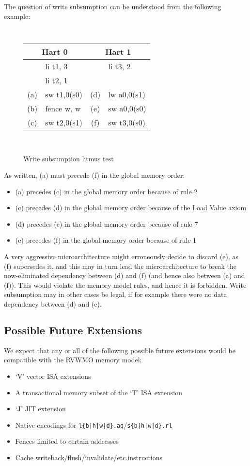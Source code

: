 The question of write subsumption can be understood from the following example:
\begin{figure}[h!]
  \centering
  {
    \tt\small
    \begin{tabular}{cl||cl}
    \multicolumn{2}{c}{Hart 0} & \multicolumn{2}{c}{Hart 1} \\
    \hline
        & li t1, 3    &     & li  t3, 2    \\
        & li t2, 1    &     &              \\
    (a) & sw t1,0(s0) & (d) & lw  a0,0(s1) \\
    (b) & fence w, w  & (e) & sw  a0,0(s0) \\
    (c) & sw t2,0(s1) & (f) & sw  t3,0(s0) \\
    \end{tabular}
  }
  ~~~~
  \diagram
  \caption{Write subsumption litmus test}
  \label{fig:litmus:subsumption}
\end{figure}

As written, (a) must precede (f) in the global memory order:
\begin{itemize}
  \item (a) precedes (c) in the global memory order because of rule 2
  \item (c) precedes (d) in the global memory order because of the Load Value axiom
  \item (d) precedes (e) in the global memory order because of rule 7
  \item (e) precedes (f) in the global memory order because of rule 1
\end{itemize}

A very aggressive microarchitecture might erroneously decide to discard (e), as (f) supersedes it, and this may in turn lead the microarchitecture to break the now-eliminated dependency between (d) and (f) (and hence also between (a) and (f)).
This would violate the memory model rules, and hence it is forbidden.
Write subsumption may in other cases be legal, if for example there were no data dependency between (d) and (e).

\subsection{Possible Future Extensions}

We expect that any or all of the following possible future extensions would be compatible with the RVWMO memory model:

\begin{itemize}
  \item `V' vector ISA extensions
  \item A transactional memory subset of the `T' ISA extension
  \item `J' JIT extension
  \item Native encodings for {\tt l\{b|h|w|d\}.aq}/{\tt s\{b|h|w|d\}.rl}
  \item Fences limited to certain addresses
  \item Cache writeback/flush/invalidate/etc.\@ instructions
\end{itemize}


